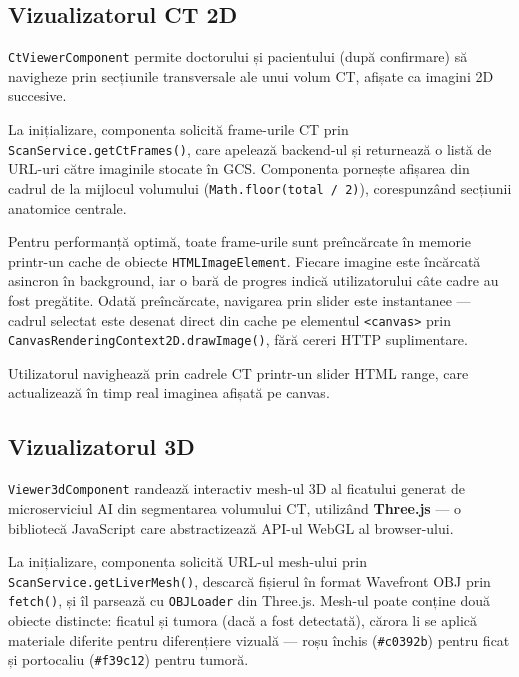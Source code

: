 \documentclass[12pt, a4paper]{report}
\begin{document}
\subsection{Vizualizatorul CT 2D}

\texttt{CtViewerComponent} permite doctorului și pacientului (după confirmare)
să navigheze prin secțiunile transversale ale unui volum CT, afișate ca imagini
2D succesive.

La inițializare, componenta solicită frame-urile CT prin
\texttt{ScanService.getCtFrames()}, care apelează backend-ul și returnează o
listă de URL-uri către imaginile stocate în GCS. Componenta pornește afișarea
din cadrul de la mijlocul volumului (\texttt{Math.floor(total / 2)}), corespunzând
secțiunii anatomice centrale.

Pentru performanță optimă, toate frame-urile sunt preîncărcate în memorie
printr-un cache de obiecte \texttt{HTMLImageElement}. Fiecare imagine este
încărcată asincron în background, iar o bară de progres indică utilizatorului
câte cadre au fost pregătite. Odată preîncărcate, navigarea prin slider este
instantanee --- cadrul selectat este desenat direct din cache pe elementul
\texttt{<canvas>} prin \texttt{CanvasRenderingContext2D.drawImage()}, fără
cereri HTTP suplimentare.

Utilizatorul navighează prin cadrele CT printr-un slider HTML range, care
actualizează în timp real imaginea afișată pe canvas.


\subsection{Vizualizatorul 3D}

\texttt{Viewer3dComponent} randează interactiv mesh-ul 3D al ficatului generat
de microserviciul AI din segmentarea volumului CT, utilizând \textbf{Three.js}
--- o bibliotecă JavaScript care abstractizează API-ul WebGL al browser-ului.

La inițializare, componenta solicită URL-ul mesh-ului prin
\texttt{ScanService.getLiverMesh()}, descarcă fișierul în format Wavefront OBJ
prin \texttt{fetch()}, și îl parsează cu \texttt{OBJLoader} din Three.js.
Mesh-ul poate conține două obiecte distincte: ficatul și tumora (dacă a fost
detectată), cărora li se aplică materiale diferite pentru diferențiere vizuală
--- roșu închis (\texttt{\#c0392b}) pentru ficat și portocaliu (\texttt{\#f39c12})
pentru tumoră.
\end{document}
